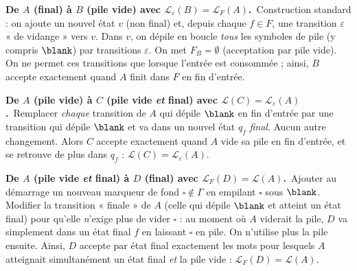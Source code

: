 \begin{corrections}
\begin{questions}

  \item \textbf{De $A$ (final) à $B$ (pile vide) avec $\mathcal{L}_\varepsilon(B)=\mathcal{L}_F(A)$.}\
    Construction standard : on ajoute un nouvel état $v$ (non final) et, depuis chaque $f\in F$, une transition $\varepsilon$ « de vidange » vers $v$. Dans $v$, on dépile en boucle \emph{tous} les symboles de pile (y compris $\blank$) par transitions $\varepsilon$. On met $F_B=\emptyset$ (acceptation par pile vide). On ne permet ces transitions que lorsque l’entrée est consommée ; ainsi, $B$ accepte exactement quand $A$ finit dans $F$ en fin d’entrée.

  \item \textbf{De $A$ (pile vide) à $C$ (pile vide \emph{et} final) avec $\mathcal{L}(C)=\mathcal{L}_\varepsilon(A)$.}\
    Remplacer \emph{chaque} transition de $A$ qui dépile $\blank$ en fin d’entrée par une transition qui dépile $\blank$ et va dans un nouvel état $q_f$ \emph{final}. Aucun autre changement. Alors $C$ accepte exactement quand $A$ vide sa pile en fin d’entrée, et se retrouve de plus dans $q_f$ : $\mathcal{L}(C)=\mathcal{L}_\varepsilon(A)$.

  \item \textbf{De $A$ (pile vide \emph{et} final) à $D$ (final) avec $\mathcal{L}_F(D)=\mathcal{L}(A)$.}\
    Ajouter au démarrage un nouveau marqueur de fond $\square\notin \Gamma$ en empilant $\square$ sous $\blank$. Modifier la transition « finale » de $A$ (celle qui dépile $\blank$ et atteint un état final) pour qu’elle \emph{n}’exige plus de vider $\square$ : au moment où $A$ viderait la pile, $D$ va simplement dans un état final $f$ en laissant $\square$ en pile. On n’utilise plus la pile ensuite. Ainsi, $D$ accepte par état final exactement les mots pour lesquels $A$ atteignait simultanément un état final \emph{et} la pile vide : $\mathcal{L}_F(D)=\mathcal{L}(A)$.

  \end{questions}

\end{corrections}

\endgroup
\endinput
